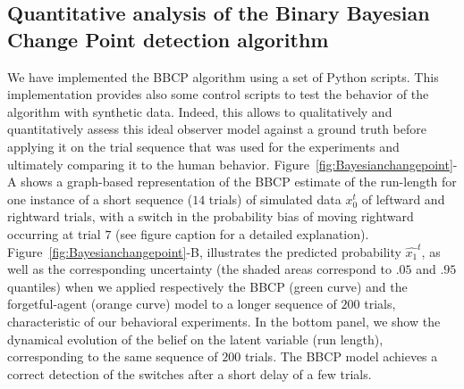 \documentclass[12pt,english]{article}%
\newcommand{\seeFig}[1]{Figure~\ref{fig:#1}}
\newcommand{\seeApp}[1]{Appendix~\ref{app:#1}}
\newcommand{\CP}[1]{\textbf{\textcolor{green}{[CP: #1]}}}
\begin{document}
\subsection{Quantitative analysis of the Binary Bayesian Change Point detection algorithm}
We have implemented 
the BBCP algorithm %
using a set of Python scripts.
This implementation provides also some control scripts
to test the behavior of the algorithm with synthetic data.
Indeed, this allows to qualitatively and quantitatively assess
this ideal observer model against a ground truth before applying it
on the trial sequence that was used for the experiments and
ultimately comparing it to the human behavior. %
\seeFig{Bayesianchangepoint}-A shows a graph-based representation of the BBCP estimate of the run-length for one instance of a short sequence ($14$ trials) of simulated data $x_0^t$
of leftward and rightward trials, with a switch in the probability bias
of moving rightward occurring at trial $7$ (see figure caption for a detailed explanation).
\seeFig{Bayesianchangepoint}-B, illustrates the predicted probability $\hat{x_1}^t$, as well as the corresponding uncertainty (the shaded areas correspond to $.05$ and $.95$ quantiles) when
we applied respectively the BBCP (green curve) and the forgetful-agent (orange curve) model to
a longer sequence of $200$ trials,
characteristic of our behavioral experiments.
In the bottom panel,
we show the dynamical evolution of the belief on the latent variable (run length),
corresponding to the same sequence of $200$ trials.
The BBCP model achieves a correct detection of the switches after a short delay of a few trials.
\end{document}
